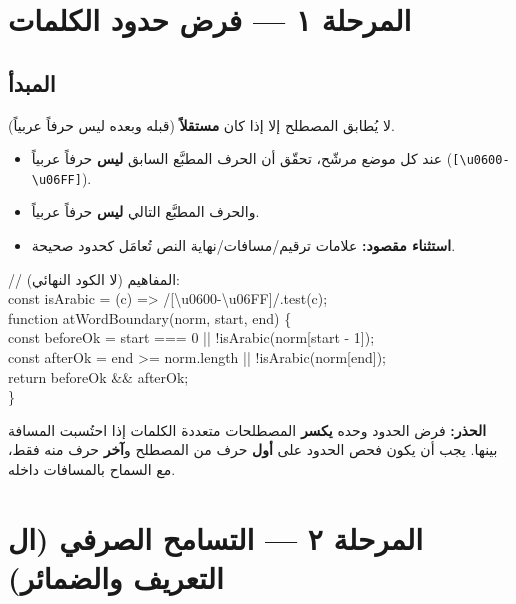 \documentclass[11pt]{article}
\begin{document}
\section{المرحلة ١ — فرض حدود الكلمات}

\subsection*{المبدأ}
لا يُطابق المصطلح إلا إذا كان \textbf{مستقلاً} (قبله وبعده ليس حرفاً عربياً).

\begin{itemize}
  \item عند كل موضع مرشّح، تحقّق أن الحرف المطبَّع السابق \textbf{ليس} حرفاً عربياً
        (\texttt{[\textbackslash u0600-\textbackslash u06FF]}).
  \item والحرف المطبَّع التالي \textbf{ليس} حرفاً عربياً.
  \item \textbf{استثناء مقصود:} علامات ترقيم/مسافات/نهاية النص تُعامَل كحدود صحيحة.
\end{itemize}

\begin{codebox}
{\ttfamily\small\raggedleft
// المفاهيم (لا الكود النهائي):\\
const isArabic = (c) => /[\textbackslash u0600-\textbackslash u06FF]/.test(c);\\
function atWordBoundary(norm, start, end) \{\\
\hspace*{1em}const beforeOk = start === 0 || !isArabic(norm[start - 1]);\\
\hspace*{1em}const afterOk = end >= norm.length || !isArabic(norm[end]);\\
\hspace*{1em}return beforeOk \&\& afterOk;\\
\}
}
\end{codebox}

\begin{warnbox}
\textbf{الحذر:} فرض الحدود وحده \textbf{يكسر} المصطلحات متعددة الكلمات إذا احتُسبت المسافة بينها.
يجب أن يكون فحص الحدود على \textbf{أول} حرف من المصطلح و\textbf{آخر} حرف منه فقط، مع السماح بالمسافات داخله.
\end{warnbox}

\section{المرحلة ٢ — التسامح الصرفي (ال التعريف والضمائر)}
\end{document}
